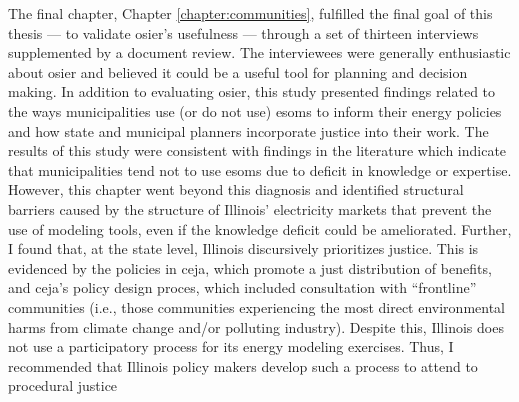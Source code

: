 The final chapter, Chapter \ref{chapter:communities}, fulfilled the final goal
of this thesis --- to validate \ac{osier}'s usefulness --- through a set of
thirteen interviews supplemented by a document review. The interviewees were
generally enthusiastic about \ac{osier} and believed it could be a useful tool
for planning and decision making. In addition to evaluating \ac{osier}, this
study presented findings related to the ways municipalities use (or do not use)
\acp{esom} to inform their energy policies and how state and municipal planners
incorporate justice into their work. The results of this study were consistent
with findings in the literature which indicate that municipalities tend not to
use \acp{esom} due to deficit in knowledge or expertise. However, this chapter
went beyond this diagnosis and identified structural barriers caused by the
structure of Illinois' electricity markets that prevent the use of modeling
tools, even if the knowledge deficit could be ameliorated. Further, I found
that, at the state level, Illinois discursively prioritizes justice. This is
evidenced by the policies in \ac{ceja}, which promote a just distribution of
benefits, and \ac{ceja}'s policy design proces, which included consultation with
``frontline'' communities (i.e., those communities experiencing the most direct
environmental harms from climate change and/or polluting industry). Despite
this, Illinois does not use a participatory process for its energy modeling
exercises. Thus, I recommended that Illinois policy makers develop such a
process to attend to procedural justice 
 
